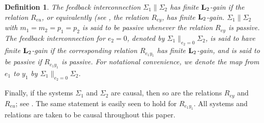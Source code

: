 \documentclass[11pt]{article}
\newtheorem{defn}[lemma]{Definition}
\newcommand{\Ltwo}{\boldsymbol{\rm L}_{2}}
\newcommand{\Ltwoe}{\boldsymbol{\rm L}_{2e}}
\begin{document}
\begin{defn} \label{def: FB} The feedback interconnection $\Sigma_1 \| \Sigma_2$ has \emph{finite $\Ltwo$-gain} if the relation $R_{eu}$, or equivalently (see \cite[Lemma 1.2.12]{Sch17}, the relation $R_{ey}$, has finite $\Ltwo$-gain. 
$\Sigma_1 \| \Sigma_2$ with $m_1=m_2=p_1=p_2$ is said to be \emph{passive} whenever the relation $R_{ey}$ is passive. 
The feedback interconnection for $e_2 = 0$, denoted by $\Sigma_1 \|_{e_2=0} \Sigma_2$, is said to have finite $\Ltwo$-gain if the corresponding relation $R_{e_1y_1}$ has finite $\Ltwo$-gain, 
and is said to be passive if $R_{e_1y_1}$ is passive. For notational convenience, we denote the map from $e_1$ to $y_1$ by $\Sigma_1 \|_{e_2=0} \Sigma_2$.
\end{defn}
Finally, if the systems $\Sigma_1$ and $\Sigma_2$ are causal, then so are the relations $R_{ey}$ and $R_{eu}$; see \cite[Proposition
1.2.14]{Sch17}. The same statement is easily seen to hold for $R_{e_1y_1}$. All systems and relations are taken to be causal throughout this paper.
%

\end{document}
